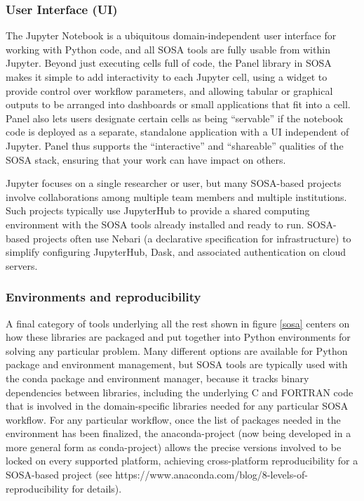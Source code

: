 \subsubsection{User Interface (UI)}

The Jupyter Notebook is a ubiquitous domain-independent user interface for working with Python code, and all SOSA tools are fully usable from within Jupyter. Beyond just executing cells full of code, the Panel library in SOSA makes it simple to add interactivity to each Jupyter cell, using a widget to provide control over workflow parameters, and allowing tabular or graphical outputs to be arranged into dashboards or small applications that fit into a cell. Panel also lets users designate certain cells as being ``servable'' if the notebook code is deployed as a separate, standalone application with a UI independent of Jupyter. Panel thus supports the ``interactive'' and ``shareable'' qualities of the SOSA stack, ensuring that your work can have impact on others.

Jupyter focuses on a single researcher or user, but many SOSA-based projects involve collaborations among multiple team members and multiple institutions. Such projects typically use JupyterHub to provide a shared computing environment with the SOSA tools already installed and ready to run. SOSA-based projects often use Nebari (a declarative specification for infrastructure) to simplify configuring JupyterHub, Dask, and associated authentication on cloud servers.

\subsubsection{Environments and reproducibility}

A final category of tools underlying all the rest shown in figure \ref{sosa} centers on how these libraries are packaged and put together into Python environments for solving any particular problem. Many different options are available for Python package and environment management, but SOSA tools are typically used with the conda package and environment manager, because it tracks binary dependencies between libraries, including the underlying C and FORTRAN code that is involved in the domain-specific libraries needed for any particular SOSA workflow. For any particular workflow, once the list of packages needed in the environment has been finalized, the anaconda-project (now being developed in a more general form as conda-project) allows the precise versions involved to be locked on every supported platform, achieving cross-platform reproducibility for a SOSA-based project (see
https://www.anaconda.com/blog/8-levels-of-reproducibility for details).


